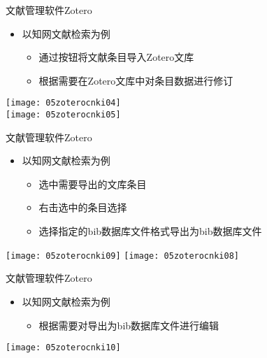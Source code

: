 \documentclass[fontset = none, t]{ctexbeamer}
\begin{document}
\begin{frame}[fragile]{文献管理软件}{Zotero}
  \begin{spacing}{1.2}
    \begin{itemize}
    \item 以\alert{知网}文献检索为例
      \begin{itemize}
      \item 通过按钮将文献条目导入Zotero文库
      \item 根据需要在Zotero文库中对条目数据进行修订
      \end{itemize}
    \end{itemize}    
    \begin{center}
      \texttt{[image: 05zoterocnki04]}\\%
      \texttt{[image: 05zoterocnki05]}
    \end{center}
  \end{spacing}
\end{frame}

\begin{frame}[fragile]{文献管理软件}{Zotero}
  \begin{spacing}{1.2}
    \begin{itemize}
    \item 以\alert{知网}文献检索为例
      \begin{itemize}
      \item 选中需要导出的文库条目
      \item 右击选中的条目选择
      \item 选择指定的bib数据库文件格式导出为bib数据库文件
      \end{itemize}
    \end{itemize}    
    \begin{center}
      \texttt{[image: 05zoterocnki09]}\quad
      \texttt{[image: 05zoterocnki08]}
    \end{center}
  \end{spacing}
\end{frame}

\begin{frame}[fragile]{文献管理软件}{Zotero}
  \begin{spacing}{1.2}
    \begin{itemize}
    \item 以\alert{知网}文献检索为例
      \begin{itemize}
      \item 根据需要对导出为bib数据库文件进行编辑
      \end{itemize}
    \end{itemize}    
    \begin{center}
      \texttt{[image: 05zoterocnki10]}
    \end{center}
  \end{spacing}
\end{frame}
\end{document}
